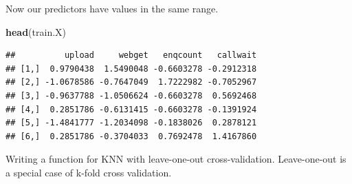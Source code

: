 \documentclass[
]{article}
\newenvironment{Shaded}{\begin{snugshade}}{\end{snugshade}}
\newcommand{\KeywordTok}[1]{\textcolor[rgb]{0.13,0.29,0.53}{\textbf{#1}}}
\newcommand{\NormalTok}[1]{#1}
\begin{document}
Now our predictors have values in the same range.

\begin{Shaded}
\begin{Highlighting}[]
\KeywordTok{head}\NormalTok{(train.X)}
\end{Highlighting}
\end{Shaded}

\begin{verbatim}
##          upload     webget   enqcount   callwait
## [1,]  0.9790438  1.5490048 -0.6603278 -0.2912318
## [2,] -1.0678586 -0.7647049  1.7222982 -0.7052967
## [3,] -0.9637788 -1.0506624 -0.6603278  0.5692468
## [4,]  0.2851786 -0.6131415 -0.6603278 -0.1391924
## [5,] -1.4841777 -1.2034098 -0.1838026  0.2878121
## [6,]  0.2851786 -0.3704033  0.7692478  1.4167860
\end{verbatim}

Writing a function for KNN with leave-one-out cross-validation.
Leave-one-out is a special case of k-fold cross validation.
\end{document}
